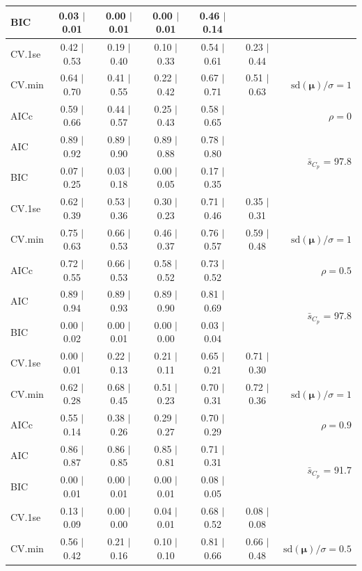 \documentclass[12pt]{article}
\newcommand{\mr}[1]{\mathrm{#1}}
\newcommand{\bm}[1]{\mathbf{#1}}
\begin{document}
\begin{table}[p]
\begin{center}
\begin{tabular}{l*{5}{c}|r}
BIC & 0.03 $\mid$ 0.01 & 0.00 $\mid$ 0.01 & 0.00 $\mid$ 0.01 & 0.46 $\mid$ 0.14 & & \\
 \hline 
CV.1se & 0.42 $\mid$ 0.53 & 0.19 $\mid$ 0.40 & 0.10 $\mid$ 0.33 & 0.54 $\mid$ 0.61 & 0.23 $\mid$ 0.44 &\\
CV.min & 0.64 $\mid$ 0.70 & 0.41 $\mid$ 0.55 & 0.22 $\mid$ 0.42 & 0.67 $\mid$ 0.71 & 0.51 $\mid$ 0.63 &  $\mr{sd}(\bm{\mu})/\sigma=1$ \\
AICc & 0.59 $\mid$ 0.66 & 0.44 $\mid$ 0.57 & 0.25 $\mid$ 0.43 & 0.58 $\mid$ 0.65 & & $\rho=0$ \\
AIC & 0.89 $\mid$ 0.92 & 0.89 $\mid$ 0.90 & 0.89 $\mid$ 0.88 & 0.78 $\mid$ 0.80 & & \multirow{2}{*}{$\bar{s}_{C_p}$ = 97.8} \\
BIC & 0.07 $\mid$ 0.25 & 0.03 $\mid$ 0.18 & 0.00 $\mid$ 0.05 & 0.17 $\mid$ 0.35 & & \\
 \hline 
CV.1se & 0.62 $\mid$ 0.39 & 0.53 $\mid$ 0.36 & 0.30 $\mid$ 0.23 & 0.71 $\mid$ 0.46 & 0.35 $\mid$ 0.31 &\\
CV.min & 0.75 $\mid$ 0.63 & 0.66 $\mid$ 0.53 & 0.46 $\mid$ 0.37 & 0.76 $\mid$ 0.57 & 0.59 $\mid$ 0.48 &  $\mr{sd}(\bm{\mu})/\sigma=1$ \\
AICc & 0.72 $\mid$ 0.55 & 0.66 $\mid$ 0.53 & 0.58 $\mid$ 0.52 & 0.73 $\mid$ 0.52 & & $\rho=0.5$ \\
AIC & 0.89 $\mid$ 0.94 & 0.89 $\mid$ 0.93 & 0.89 $\mid$ 0.90 & 0.81 $\mid$ 0.69 & & \multirow{2}{*}{$\bar{s}_{C_p}$ = 97.8} \\
BIC & 0.00 $\mid$ 0.02 & 0.00 $\mid$ 0.01 & 0.00 $\mid$ 0.00 & 0.03 $\mid$ 0.04 & & \\
 \hline 
CV.1se & 0.00 $\mid$ 0.01 & 0.22 $\mid$ 0.13 & 0.21 $\mid$ 0.11 & 0.65 $\mid$ 0.21 & 0.71 $\mid$ 0.30 &\\
CV.min & 0.62 $\mid$ 0.28 & 0.68 $\mid$ 0.45 & 0.51 $\mid$ 0.23 & 0.70 $\mid$ 0.31 & 0.72 $\mid$ 0.36 &  $\mr{sd}(\bm{\mu})/\sigma=1$ \\
AICc & 0.55 $\mid$ 0.14 & 0.38 $\mid$ 0.26 & 0.29 $\mid$ 0.27 & 0.70 $\mid$ 0.29 & & $\rho=0.9$ \\
AIC & 0.86 $\mid$ 0.87 & 0.86 $\mid$ 0.85 & 0.85 $\mid$ 0.81 & 0.71 $\mid$ 0.31 & & \multirow{2}{*}{$\bar{s}_{C_p}$ = 91.7} \\
BIC & 0.00 $\mid$ 0.01 & 0.00 $\mid$ 0.01 & 0.00 $\mid$ 0.01 & 0.08 $\mid$ 0.05 & & \\
 \hline 
CV.1se & 0.13 $\mid$ 0.09 & 0.00 $\mid$ 0.00 & 0.04 $\mid$ 0.01 & 0.68 $\mid$ 0.52 & 0.08 $\mid$ 0.08 &\\
CV.min & 0.56 $\mid$ 0.42 & 0.21 $\mid$ 0.16 & 0.10 $\mid$ 0.10 & 0.81 $\mid$ 0.66 & 0.66 $\mid$ 0.48 &  $\mr{sd}(\bm{\mu})/\sigma=0.5$ \\

\end{tabular}
\end{center}
\end{table}
\end{document}
